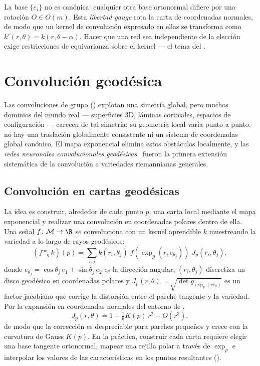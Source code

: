 \begin{remark}
\label{rem:geo:gauge}
La base $\{e_i\}$ no es can\'onica: cualquier otra base ortonormal difiere por
una rotaci\'on $O \in O(m)$. Esta \emph{libertad gauge} rota la carta de
coordenadas normales, de modo que un kernel de convoluci\'on expresado en ellas
se transforma como $k'(r,\theta) = k(r, \theta - \alpha)$. Hacer que una red sea
independiente de la elecci\'on exige restricciones de equivarianza sobre el
kernel --- el tema del .
\end{remark}

\section{Convoluci\'on geod\'esica}
\label{sec:geo:convolution}

Las convoluciones de grupo () explotan una simetr\'ia global,
pero muchos dominios del mundo real --- superficies 3D, l\'aminas corticales,
espacios de configuraci\'on --- carecen de tal simetr\'ia: su geometr\'ia local
var\'ia punto a punto, no hay una traslaci\'on globalmente consistente ni un
sistema de coordenadas global can\'onico. El mapa exponencial elimina estos
obst\'aculos localmente, y las \emph{redes neuronales convolucionales
geod\'esicas}~\citep{masci2015geodesic} fueron la primera extensi\'on
sistem\'atica de la convoluci\'on a variedades riemannianas generales.

\subsection{Convoluci\'on en cartas geod\'esicas}
\label{subsec:geo:gcnn}

La idea es construir, alrededor de cada punto $p$, una carta local mediante el
mapa exponencial y realizar una convoluci\'on en coordenadas polares dentro de
ella. Una se\~nal $f \colon \M \to \R$ se convoluciona con un kernel aprendible
$k$ muestreando la variedad a lo largo de rayos geod\'esicos:
\begin{equation}
\label{eq:geo:gcnn}
  (f *_g k)(p) = \sum_{i,j} k(r_i, \theta_j)\;
    f\!\left(\exp_p(r_i\, e_{\theta_j})\right)\; J_p(r_i, \theta_j),
\end{equation}
donde $e_{\theta_j} = \cos\theta_j\, e_1 + \sin\theta_j\, e_2$ es la direcci\'on
angular, $(r_i, \theta_j)$ discretiza un disco geod\'esico en coordenadas
polares y $J_p(r, \theta) = \sqrt{\det g_{\exp_p(r e_\theta)}}$ es un factor
jacobiano que corrige la distorsi\'on entre el parche tangente y la variedad.
Por la expansi\'on en coordenadas normales del entorno de ,
\[
  J_p(r, \theta) = 1 - \tfrac{1}{6} K(p)\, r^2 + O(r^3),
\]
de modo que la correcci\'on es despreciable para parches peque\~nos y crece con
la curvatura de Gauss $K(p)$. En la pr\'actica, construir cada carta requiere
elegir una base tangente ortonormal, mapear una rejilla polar a trav\'es de
$\exp_p$ e interpolar los valores de las caracter\'isticas en los puntos
resultantes ().

